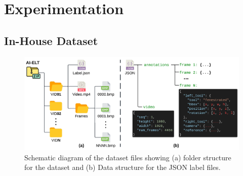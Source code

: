 \section{Experimentation}


\subsection{In-House Dataset}







\begin{figure}[htbp]
    \centering
    \includegraphics[width=\linewidth]{schematic_diagram.png}
    \caption{Schematic diagram of the dataset files showing (a) folder structure for the dataset and (b) Data structure for the JSON label files.}
    \label{fig:schematic_diagram}
\end{figure}

